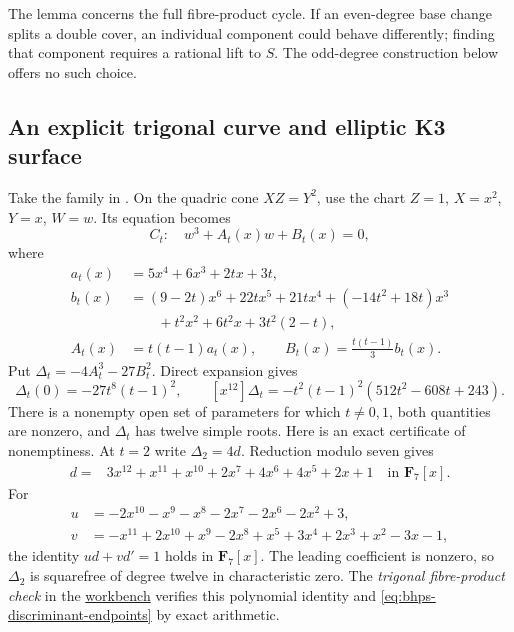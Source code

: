 \documentclass[11pt]{article}
\theoremstyle{definition}
\theoremstyle{remark}
\newcommand{\workbenchurl}{https://github.com/KokunoYumeto/algebraic-cycles-and-motives-workbench}
\begin{document}
The lemma concerns the full fibre-product cycle.  If an even-degree
base change splits a double cover, an individual component could
behave differently; finding that component requires a rational
lift to $S$.  The odd-degree construction below offers no such
choice.

\subsection{An explicit trigonal curve and elliptic K3 surface}

Take the family in
\cite[Theorem~1.2(ii), equation~(1.2)]{BHPS}.
On the quadric cone $XZ=Y^2$, use the chart
$Z=1$, $X=x^2$, $Y=x$, $W=w$.  Its equation becomes
\[
 C_t:\quad w^3+A_t(x)w+B_t(x)=0,
\]
where
\begin{align*}
 a_t(x)&=5x^4+6x^3+2tx+3t,\\
 b_t(x)&=(9-2t)x^6+22tx^5+21tx^4+(-14t^2+18t)x^3\\
       &\hspace{2em}+t^2x^2+6t^2x+3t^2(2-t),\\
 A_t(x)&=t(t-1)a_t(x),\qquad
 B_t(x)=\frac{t(t-1)}3b_t(x).
\end{align*}
Put $\Delta_t=-4A_t^3-27B_t^2$.  Direct expansion gives
\begin{equation}
 \Delta_t(0)=-27t^8(t-1)^2,
 \qquad [x^{12}]\Delta_t=-t^2(t-1)^2(512t^2-608t+243).
 \label{eq:bhps-discriminant-endpoints}
\end{equation}
There is a nonempty open set of parameters for which $t\ne0,1$,
both quantities are nonzero, and $\Delta_t$ has twelve simple roots.
Here is an exact certificate of nonemptiness.  At $t=2$ write
$\Delta_2=4d$.  Reduction modulo seven gives
\begin{align*}
 d={}&3x^{12}+x^{11}+x^{10}+2x^7+4x^6+4x^5+2x+1
                    \quad\text{in }\mathbf F_7[x].
\end{align*}
For
\begin{align*}
 u&=-2x^{10}-x^9-x^8-2x^7-2x^6-2x^2+3,\\
 v&=-x^{11}+2x^{10}+x^9-2x^8+x^5+3x^4+2x^3+x^2-3x-1,
\end{align*}
the identity $ud+vd'=1$ holds in $\mathbf F_7[x]$.
The leading coefficient is nonzero, so $\Delta_2$ is squarefree
of degree twelve in characteristic zero.  The
\emph{trigonal fibre-product check} in the
\href{\workbenchurl}{workbench} verifies this polynomial identity
and \eqref{eq:bhps-discriminant-endpoints} by exact arithmetic.
\end{document}
